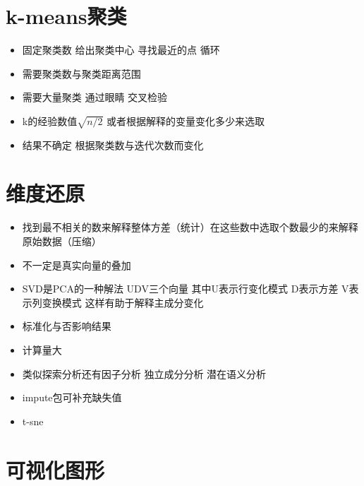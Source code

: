 \documentclass[]{book}
\providecommand{\tightlist}{%
  \setlength{\itemsep}{0pt}\setlength{\parskip}{0pt}}
\begin{document}
\hypertarget{k-meansux805aux7c7b}{%
\section{k-means聚类}\label{k-meansux805aux7c7b}}

\begin{itemize}
\tightlist
\item
  固定聚类数 给出聚类中心 寻找最近的点 循环
\item
  需要聚类数与聚类距离范围
\item
  需要大量聚类 通过眼睛 交叉检验
\item
  k的经验数值\(\sqrt{n/2}\) 或者根据解释的变量变化多少来选取
\item
  结果不确定 根据聚类数与迭代次数而变化
\end{itemize}

\hypertarget{ux7ef4ux5ea6ux8fd8ux539f}{%
\section{维度还原}\label{ux7ef4ux5ea6ux8fd8ux539f}}

\begin{itemize}
\tightlist
\item
  找到最不相关的数来解释整体方差（统计）在这些数中选取个数最少的来解释原始数据（压缩）
\item
  不一定是真实向量的叠加
\item
  SVD是PCA的一种解法 UDV三个向量 其中U表示行变化模式 D表示方差 V表示列变换模式 这样有助于解释主成分变化
\item
  标准化与否影响结果
\item
  计算量大
\item
  类似探索分析还有因子分析 独立成分分析 潜在语义分析
\item
  impute包可补充缺失值
\item
  t-sne
\end{itemize}

\hypertarget{ux53efux89c6ux5316ux56feux5f62}{%
\section{可视化图形}\label{ux53efux89c6ux5316ux56feux5f62}}
\end{document}
